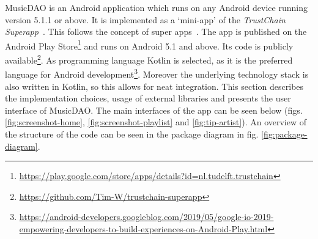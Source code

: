MusicDAO is an Android application which runs on any Android device running version 5.1.1 or above. It is implemented as a `mini-app' of the \textit{TrustChain Superapp}~\citep{mattskala2020}. This follows the concept of super apps~\citep{kpmg2019superapps}. The app is published on the Android Play Store\footnote{\url{https://play.google.com/store/apps/details?id=nl.tudelft.trustchain}} and runs on Android 5.1 and above. Its code is publicly available\footnote{\url{https://github.com/Tim-W/trustchain-superapp}}. As programming language Kotlin is selected, as it is the preferred language for Android development\footnote{\url{https://android-developers.googleblog.com/2019/05/google-io-2019-empowering-developers-to-build-experiences-on-Android-Play.html}}. Moreover the underlying technology stack is also written in Kotlin, so this allows for neat integration. This section describes the implementation choices, usage of external libraries and presents the user interface of MusicDAO. The main interfaces of the app can be seen below (figs. \ref{fig:screenshot-home}, \ref{fig:screenshot-playlist} and \ref{fig:tip-artist}). An overview of the structure of the code can be seen in the package diagram in fig. \ref{fig:package-diagram}.

